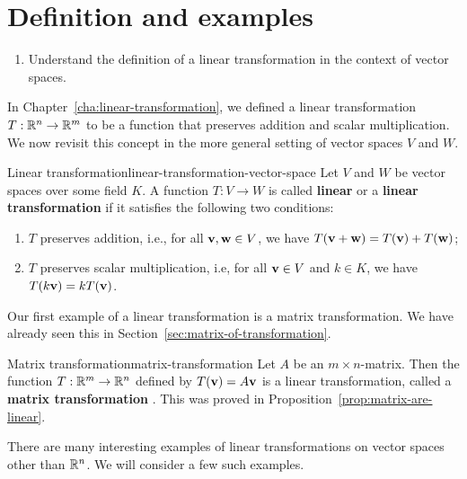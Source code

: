 \section{Definition and examples}

\begin{outcome}
  \begin{enumerate}
  \item Understand the definition of a linear transformation in the
    context of vector spaces.
  \end{enumerate}
\end{outcome}

In Chapter~\ref{cha:linear-transformation}, we defined a linear
transformation $T:\mathbb{R}^n\to\mathbb{R}^m$ to be a function that preserves
addition and scalar multiplication. We now revisit this concept in the
more general setting of vector spaces $V$ and $W$.

\begin{definition}{Linear transformation}{linear-transformation-vector-space}
  Let $V$ and $W$ be vector spaces over some field $K$. A function
  $T: V \to W$ is called \textbf{linear} or a \textbf{linear
    transformation}%
   if it satisfies the
  following two conditions:
  \begin{enumerate}
  \item $T$ preserves addition, i.e., for all\/
    $\mbox{\bf v},\mbox{\bf w}\in V$, we have
    $T(\mbox{\bf v}+\mbox{\bf w}) = T(\mbox{\bf v}) + T(\mbox{\bf w})$;
  \item $T$ preserves scalar multiplication, i.e, for all\/
    $\mbox{\bf v}\in V$ and $k\in K$, we have
    $T(k\mbox{\bf v}) = kT(\mbox{\bf v})$.
  \end{enumerate}
\end{definition}

Our first example of a linear transformation is a matrix
transformation. We have already seen this in
Section~\ref{sec:matrix-of-transformation}.

\begin{example}{Matrix transformation}{matrix-transformation}
  Let $A$ be an $m\times n$-matrix. Then the function $T:\mathbb{R}^m\to\mathbb{R}^n$
  defined by $T(\mbox{\bf v})=A\mbox{\bf v}$ is a linear transformation,
  called a \textbf{matrix transformation}%
  . This was proved in
  Proposition~\ref{prop:matrix-are-linear}.
\end{example}

There are many interesting examples of linear transformations on
vector spaces other than $\mathbb{R}^n$. We will consider a few such examples.

